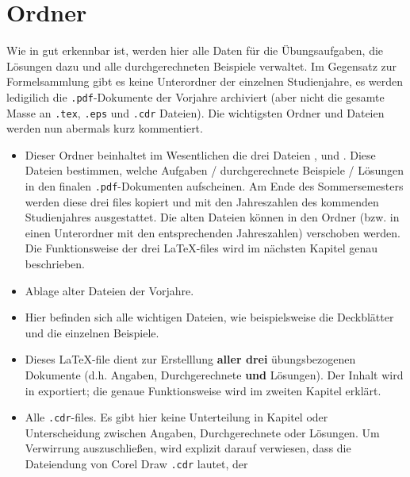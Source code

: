 \section{Ordner }

Wie in  gut erkennbar ist, werden hier alle Daten für
die Übungsaufgaben, die Lösungen dazu und alle durchgerechneten Beispiele
verwaltet. Im Gegensatz zur Formelsammlung gibt es keine Unterordner der
einzelnen Studienjahre, es werden ledigilich die {\tt .pdf}-Dokumente der 
Vorjahre archiviert (aber nicht die gesamte Masse an {\tt .tex}, {\tt .eps} und 
{\tt .cdr} Dateien). Die wichtigsten Ordner und Dateien werden nun abermals kurz
kommentiert.

\begin{itemize}
  \item {} Dieser Ordner beinhaltet im
    Wesentlichen die drei Dateien ,
     und \linebreak
    . Diese Dateien bestimmen, welche
    Aufgaben / durchgerechnete Beispiele / Lösungen in den finalen
    {\tt .pdf}-Dokumenten aufscheinen. Am Ende des Sommersemesters werden diese
    drei files kopiert und mit den Jahreszahlen des kommenden Studienjahres
    ausgestattet. Die alten Dateien können in den Ordner
     (bzw. in einen Unterordner mit den
    entsprechenden Jahreszahlen) verschoben werden. Die Funktionsweise der drei
    \LaTeX-files wird im nächsten Kapitel genau beschrieben.
  \item {} Ablage alter Dateien der Vorjahre.
  \item {} Hier befinden sich alle wichtigen Dateien, wie
    beispielsweise die Deckblätter und die einzelnen Beispiele.
  \item {} Dieses \LaTeX-file dient zur Erstelllung
    {\bf aller drei} übungsbezogenen Dokumente (d.h. Angaben, Durchgerechnete
    {\bf und} Lösungen). Der Inhalt wird in  exportiert;
    die genaue Funktionsweise wird im zweiten Kapitel erklärt.
  \item {} Alle {\tt .cdr}-files. Es gibt hier keine
    Unterteilung in Kapitel oder Unterscheidung zwischen Angaben,
    Durchgerechnete oder Lösungen. Um Verwirrung auszuschließen, wird explizit
    darauf verwiesen, dass die Dateiendung von Corel Draw {\tt .cdr} lautet, der

\end{itemize}
